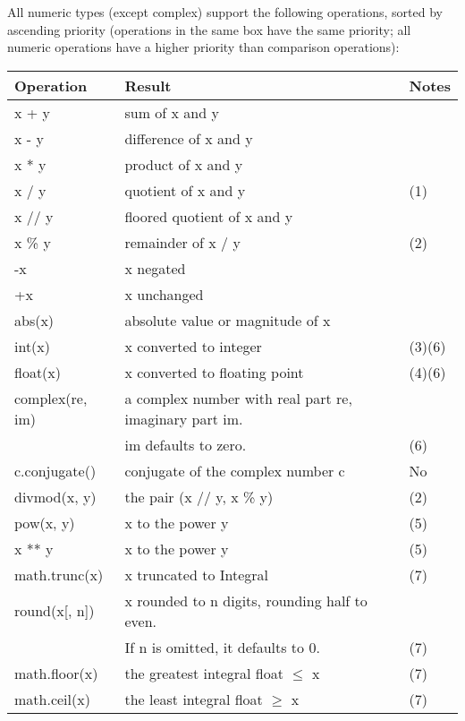 \vpara
All numeric types (except complex) support the following operations, sorted by ascending priority (operations in the same box have the same priority; all numeric operations have a higher priority than comparison operations):


\begin{table}[ht]
	\centering
	\begin{tabular}{|l|l|l|}
		\hline
		Operation & Result & Notes\\
		\hline
		x + y & sum of x and y &   \\
		x - y & difference of x and y &   \\
		x * y & product of x and y &   \\				
		x / y & quotient of x and y &  (1) \\
		x // y & floored quotient of x and y &  \\
		x \% y & remainder of x / y &  (2) \\				
		-x & x negated &   \\
		+x & x unchanged &   \\
		abs(x) & absolute value or magnitude of x &   \\
		int(x) & x converted to integer &  (3)(6) \\
		float(x) & x converted to floating point &  (4)(6) \\
		complex(re, im) & a complex number with real part re, imaginary part im. &  \\
		 & im defaults to zero. &  (6) \\
		c.conjugate() & conjugate of the complex number c &  No \\
		divmod(x, y) & the pair (x // y, x \% y) &  (2) \\
		pow(x, y)  & x to the power y &  (5) \\
		x ** y &  x to the power y &  (5) \\
		math.trunc(x) &  x truncated to Integral &  (7) \\
		round(x[, n]) &  x rounded to n digits, rounding half to even. & \\
		 & If n is omitted, it defaults to 0. &  (7) \\
		math.floor(x) &  the greatest integral float $\le$ x &  (7) \\
		math.ceil(x) &  the least integral float $\ge$ x &  (7) \\
		\hline
	\end{tabular}
\end{table}
    


